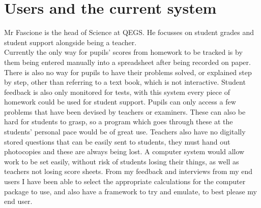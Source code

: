 \documentclass[a4paper,12pt]{book}
\begin{document}
\section{Users and the current system}

Mr Fascione is the head of Science at QEGS.  He focusses on student grades and student support alongside being a teacher.\\
Currently the only way for pupils’ scores from homework to be tracked is by them being entered manually into a spreadsheet after being recorded on paper. There is also no way for pupils to have their problems solved, or explained step by step, other than referring to a text book, which is not interactive. Student feedback is also only monitored for tests, with this system every piece of homework could be used for student support.
Pupils can only access a few problems that have been devised by teachers or examiners. These can also be hard for students to grasp, so a program which goes through these at the students’ personal pace would be of great use. Teachers also have no digitally stored questions that can be easily sent to students, they must hand out photocopies and these are always being lost. A computer system would allow work to be set easily, without risk of students losing their things, as well as teachers not losing score sheets.
From my feedback and interviews from my end users I have been able to select the appropriate calculations for the computer package to use, and also have a framework to try and emulate, to best please my end user.\\
\end{document}
